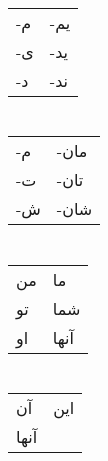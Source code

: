 \documentclass[landscape]{article}
\newcommand\ه{\hline}
\begin{document}
\begin{multicols}{3}
	\section*{}
	\begin{tabularx}{\columnwidth}{XX}
	\\-م & -یم
	\\-ی & -ید
	\\-د & -ند
    \end{tabularx}
    
    \section*{}
    \begin{tabularx}{\columnwidth}{XX}
    \\-م & -مان
    \\-ت & -تان
    \\-ش & -شان
    \end{tabularx}
    
    \section*{}
    \begin{tabularx}{\columnwidth}{XX}
    \\من & ما
    \\تو & شما
    \\او & آنها
    \end{tabularx}
    
    \section*{}
    \begin{tabularx}{\columnwidth}{XX}
    \\آن & این
    \\آنها &
    \end{tabularx}
\end{multicols}
\end{document}
